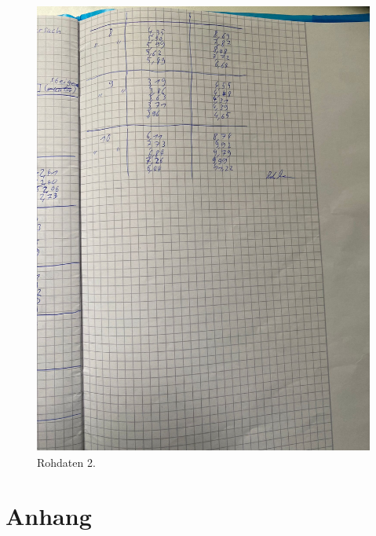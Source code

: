 \begin{figure}[H]
  \includegraphics[width=\textwidth, height=15cm]{Bilder/rohdaten2.jpg}
  \caption{Rohdaten 2.}
\end{figure}

\section{Anhang}


